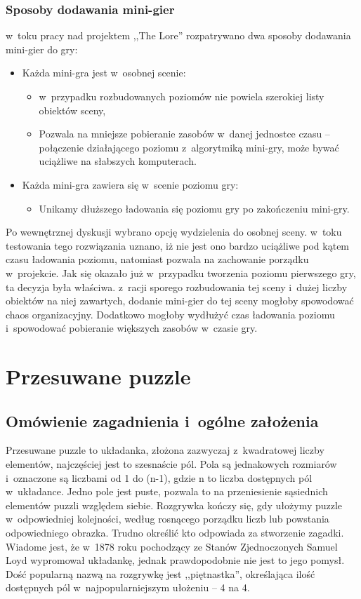 \documentclass[oneside,polski,logo]{amuthesis}
\begin{document}
\subsubsection{Sposoby dodawania mini-gier}
\par w~toku pracy nad projektem ,,The Lore'' rozpatrywano dwa sposoby dodawania mini-gier do gry:
\begin{itemize}
\item{Każda mini-gra jest w~osobnej scenie:}
\begin{itemize}
\item w~przypadku rozbudowanych poziomów nie powiela szerokiej listy obiektów sceny,
\item Pozwala na mniejsze pobieranie zasobów w~danej jednostce czasu – połączenie działającego poziomu z~algorytmiką mini-gry, może bywać uciążliwe na słabszych komputerach.
\end{itemize}
\item{Każda mini-gra zawiera się w~scenie poziomu gry:}
\begin{itemize}
\item Unikamy dłuższego ładowania się poziomu gry po zakończeniu mini-gry.
\end{itemize}
\end{itemize}
Po wewnętrznej dyskusji wybrano opcję wydzielenia do osobnej sceny. w~toku testowania tego rozwiązania uznano, iż nie jest ono bardzo uciążliwe pod kątem czasu ładowania poziomu, natomiast pozwala na zachowanie porządku w~projekcie. Jak się okazało już w~przypadku tworzenia poziomu pierwszego gry, ta decyzja była właściwa. z~racji sporego rozbudowania tej sceny i~dużej liczby obiektów na niej zawartych, dodanie mini-gier do tej sceny mogłoby spowodować chaos organizacyjny. Dodatkowo mogłoby wydłużyć czas ładowania poziomu i~spowodować pobieranie większych zasobów w~czasie gry.


\section{Przesuwane puzzle}
\subsection{Omówienie zagadnienia i~ogólne założenia}
\par Przesuwane puzzle to układanka, złożona zazwyczaj z~kwadratowej liczby elementów, najczęściej jest to szesnaście pól. Pola są jednakowych rozmiarów i~oznaczone są liczbami od 1 do (n-1), gdzie n to liczba dostępnych pól w~układance. Jedno pole jest puste, pozwala to na przeniesienie sąsiednich elementów puzzli względem siebie. Rozgrywka kończy się, gdy ułożymy puzzle w~odpowiedniej kolejności, według rosnącego porządku liczb lub powstania odpowiedniego obrazka. Trudno określić kto odpowiada za stworzenie zagadki. Wiadome jest, że w~1878 roku pochodzący ze Stanów Zjednoczonych Samuel Loyd wypromował układankę, jednak prawdopodobnie nie jest to jego pomysł. Dość popularną nazwą na rozgrywkę jest ,,piętnastka'', określająca ilość dostępnych pól w~najpopularniejszym ułożeniu – 4 na 4.  \cite{przesuwane_puzzle}
\end{document}
